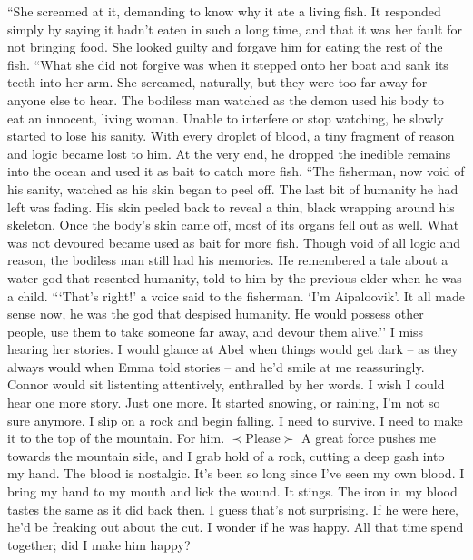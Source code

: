 \documentclass[openany, 12pt]{book}
\newcommand\tab[1][1cm]{\hspace*{#1}}
\newcommand\suck[1]{$\prec$#1$\succ$}
\begin{document}
\newline
\tab
``She screamed at it, demanding to know why it ate a living fish. It responded simply by saying it hadn’t eaten in such a long time, and that it was her fault for not bringing food. She looked guilty and forgave him for eating the rest of the fish.
\newline
\tab
``What she did not forgive was when it stepped onto her boat and sank its teeth into her arm. She screamed, naturally, but they were too far away for anyone else to hear. The bodiless man watched as the demon used his body to eat an innocent, living woman. Unable to interfere or stop watching, he slowly started to lose his sanity. With every droplet of blood, a tiny fragment of reason and logic became lost to him. At the very end, he dropped the inedible remains into the ocean and used it as bait to catch more fish.
\newline
\tab
``The fisherman, now void of his sanity, watched as his skin began to peel off. The last bit of humanity he had left was fading. His skin peeled back to reveal a thin, black wrapping around his skeleton. Once the body’s skin came off, most of its organs fell out as well.  What was not devoured became used as bait for more fish. Though void of all logic and reason, the bodiless man still had his memories. He remembered a tale about a water god that resented humanity, told to him by the previous elder when he was a child.
\newline
\tab
```That’s right!’ a voice said to the fisherman. ‘I’m Aipaloovik’. It all made sense now, he was the god that despised humanity. He would possess other people, use them to take someone far away, and devour them alive.''
\newline
\tab
I miss hearing her stories. I would glance at Abel when things would get dark -- as they always would when Emma told stories -- and he'd smile at me reassuringly. Connor would sit listenting attentively, enthralled by her words. 
\newline
\tab
I wish I could hear one more story. Just one more. It started snowing, or raining, I’m not so sure anymore. I slip on a rock and begin falling. I need to survive. I need to make it to the top of the mountain. For him.
\newline
\suck{Please}
\newline
\tab
A great force pushes me towards the mountain side, and I grab hold of a rock, cutting a deep gash into my hand. The blood is nostalgic.  It’s been so long since I’ve seen my own blood. I bring my hand to my mouth and lick the wound. It stings. The iron in my blood tastes the same as it did back then. I guess that’s not surprising. If he were here, he’d be freaking out about the cut. I wonder if he was happy. All that time spend together; did I make him happy?
\end{document}
